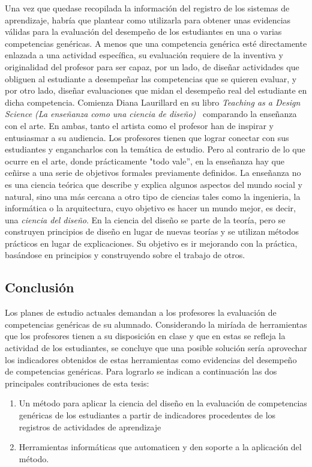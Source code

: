 Una vez que quedase recopilada la información del registro de los sistemas de aprendizaje, habría que plantear como utilizarla para obtener unas evidencias válidas para la evaluación del desempeño de los estudiantes en una o varias competencias genéricas. A menos que una competencia genérica esté directamente enlazada a una actividad específica, su evaluación requiere de la inventiva y originalidad del profesor para ser capaz, por un lado, de diseñar actividades que obliguen al estudiante a desempeñar las competencias que se quieren evaluar, y por otro lado, diseñar evaluaciones que midan el desempeño real del estudiante en dicha competencia. Comienza Diana Laurillard en su libro \emph{Teaching as a Design Science (La enseñanza como una ciencia de diseño)}~\cite{laurillard2012teaching} comparando la enseñanza con el arte. En ambas, tanto el artista como el profesor han de inspirar y entusiasmar a su audiencia. Los profesores tienen que lograr conectar con sus estudiantes y engancharlos con la temática de estudio. Pero al contrario de lo que ocurre en el arte, donde prácticamente "todo vale'', en la enseñanza hay que ceñirse a una serie de objetivos formales previamente definidos. La enseñanza no es una ciencia teórica que describe y explica algunos aspectos del mundo social y natural, sino una más cercana a otro tipo de ciencias tales como la ingenieria, la informática o la arquitectura, cuyo objetivo es hacer un mundo mejor, es decir, una \emph{ciencia del diseño}. En la ciencia del diseño se parte de la teoría, pero se construyen principios de diseño en lugar de nuevas teorías y se utilizan métodos prácticos en lugar de explicaciones. Su objetivo es ir mejorando con la práctica, basándose en principios y construyendo sobre el trabajo de otros.


\subsection*{Conclusión}

Los planes de estudio actuales demandan a los profesores la evaluación de competencias genéricas de su alumnado. Considerando la miríada de herramientas que los profesores tienen a su disposición en clase y que en estas se refleja la actividad de los estudiantes, se concluye que una posible solución sería aprovechar los indicadores obtenidos de estas herramientas como evidencias del desempeño de competencias genéricas. Para lograrlo se indican a continuación las dos principales contribuciones de esta tesis:
\begin{enumerate}
\item Un método para aplicar la ciencia del diseño en la evaluación de competencias genéricas de los estudiantes a partir de indicadores procedentes de los registros de actividades de aprendizaje
\item Herramientas informáticas que automaticen y den soporte a la aplicación del método.
\end{enumerate} 

